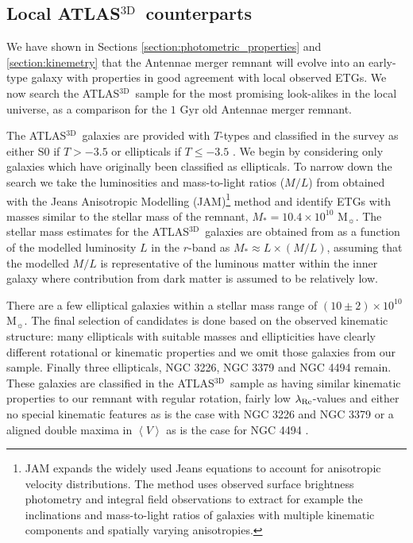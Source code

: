 \documentclass[a4paper,fleqn,usenatbib]{mnras}
\newcommand{\atlas}{\textsc{ATLAS$^\mathrm{3D}$}}
\begin{document}
\subsection{Local  \atlas\ counterparts}

We have shown in Sections \ref{section:photometric_properties} and 
\ref{section:kinemetry} that the Antennae merger remnant will evolve into an 
early-type galaxy with properties in good agreement with local observed 
ETGs. We now search the \atlas\ sample for the most promising look-alikes
in the local universe, as a comparison for the $1$ Gyr old Antennae merger remnant.

The \atlas\ galaxies are provided with $T$-types \citep{1959HDP....53..275D, 1963ApJS....8...31D} 
and classified in the survey as either S0 if $T>-3.5$
or ellipticals if $T\le -3.5$ \citep{2011MNRAS.413..813C}.
We begin by considering only galaxies which have originally been classified as ellipticals.
To narrow down the search we take the luminosities and mass-to-light ratios ($M/L$)
from \citet{2013MNRAS.432.1709C} obtained with the Jeans Anisotropic Modelling (JAM)\footnote{
JAM expands the widely used Jeans equations to account for anisotropic velocity distributions.
The method uses observed surface brightness photometry and 
integral field observations to extract for example the
inclinations and mass-to-light ratios of galaxies with multiple kinematic components and spatially 
varying anisotropies.} method \citep{2008MNRAS.390...71C}
and identify ETGs with masses similar to the stellar mass of the remnant, $M_*=10.4\times10^{10}$ M$_{\sun}$.
The stellar mass estimates for the \atlas\ galaxies are obtained from \citet{2013MNRAS.432.1709C} as a function of the 
modelled luminosity $L$ in the $r$-band as
$M_*\approx L\times (M/L)$, assuming that the modelled
$M/L$ is representative of the luminous matter within the inner 
galaxy where contribution from dark matter is assumed to be relatively low. 

There are a few elliptical galaxies within a stellar mass range of $(10\pm 2)\times10^{10}$ M$_{\sun}$.
The final selection of candidates is done based on the observed kinematic structure:
many ellipticals with suitable masses and ellipticities have clearly different
rotational or kinematic properties and we omit those galaxies from our sample. 
Finally three ellipticals, NGC 3226, NGC 3379 and NGC 4494 
remain. These galaxies are classified in the \atlas\ sample as having similar
kinematic properties to our remnant with regular rotation, fairly low $\lambda_{\rm{Re}}$-values and 
either no special kinematic features as is the case with NGC 3226 and NGC 3379 or a aligned double 
maxima in $\left\langle V\right\rangle$ as is the case for NGC 4494 \citep{2011MNRAS.414.2923K}. 
\end{document}

